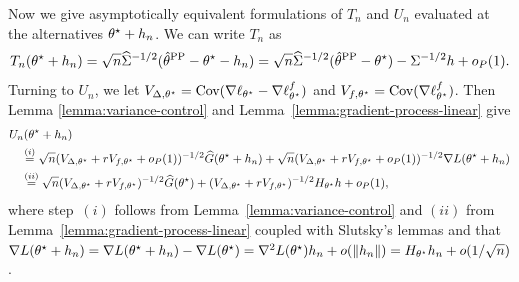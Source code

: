   
Now we give asymptotically equivalent formulations of $T_n$ and $U_n$ evaluated at the alternatives $\theta^\star + h_n$. We can write $T_n$ as
\begin{equation*}
  T_n(\theta^\star + h_n)
  = \sqrt{n} \widehat\Sigma^{-1/2} (\hat{\theta}^{\mathrm{PP}} - \theta^\star - h_n)
  = \sqrt{n} \widehat\Sigma^{-1/2} (\hat{\theta}^{\mathrm{PP}} - \theta^\star)
  - \Sigma^{-1/2} h + o_P(1).
\end{equation*}
Turning to $U_n$, we let $V_{\Delta,\theta^\star} = \textup{Cov}(\nabla \ell_{\theta^\star}
- \nabla \ell_{\theta^\star}^f)$ and
$V_{f,\theta^\star} = \textup{Cov}(\nabla \ell_{\theta^\star}^f)$. Then Lemma \ref{lemma:variance-control} and
Lemma~\ref{lemma:gradient-process-linear} give
\begin{align*}
  &U_n(\theta^\star + h_n)\\
  &\quad \stackrel{(i)}{=} \sqrt{n} (V_{\Delta,\theta^\star} + r V_{f,\theta^\star} + o_P(1))^{-1/2}
  \widehat G(\theta^\star + h_n)
  + \sqrt{n} (V_{\Delta,\theta^\star} + r V_{f,\theta^\star} + o_P(1))^{-1/2}
  \nabla L(\theta^\star + h_n)
  \\
  &\quad \stackrel{(ii)}{=}
  \sqrt{n} (V_{\Delta,\theta^\star} + r V_{f,\theta^\star})^{-1/2}
  \widehat G(\theta^\star) + (V_{\Delta,\theta^\star} + r V_{f,\theta^\star})^{-1/2} H_{\theta^\star} h
  + o_P(1),
\end{align*}
where step~$(i)$ follows from Lemma~\ref{lemma:variance-control}
and $(ii)$ from Lemma~\ref{lemma:gradient-process-linear} coupled
with Slutsky's lemmas and
that $\nabla L(\theta^\star + h_n) = \nabla L(\theta^\star + h_n)
- \nabla L(\theta^\star) = \nabla^2 L(\theta^\star)h_n + o(\left\|{h_n}\right\|)
= H_{\theta^\star} h_n + o(1/\sqrt{n})$.

